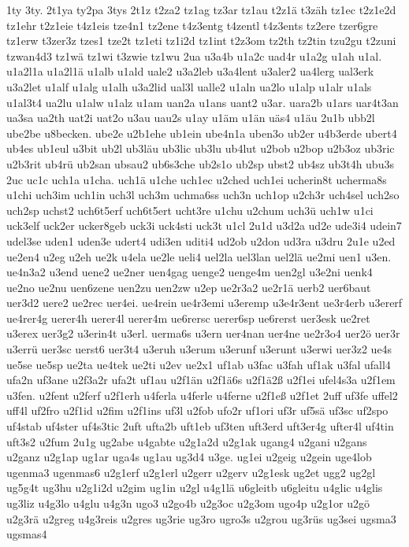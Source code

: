 {1ty
3ty.
2t1ya
ty2pa
3tys
2t1z
t2za2
tz1ag
tz3ar
tz1au
t2z1ä
t3zäh
tz1ec
t2z1e2d
tz1ehr
t2z1eie
t4z1eis
tze4n1
tz2ene
t4z3entg
t4zentl
t4z3ents
tz2ere
tzer6gre
tz1erw
t3zer3z
tzes1
tze2t
tz1eti
tz1i2d
tz1int
t2z3om
tz2th
tz2tin
tzu2gu
t2zuni
tzwan4d3
tz1wä
tz1wi
t3zwie
tz1wu
2ua
u3a4b
u1a2c
uad4r
u1a2g
u1ah
u1al.
u1a2l1a
u1a2l1ä
u1alb
u1ald
uale2
u3a2leb
u3a4lent
u3aler2
ua4lerg
ual3erk
u3a2let
u1alf
u1alg
u1alh
u3a2lid
ual3l
ualle2
u1aln
ua2lo
u1alp
u1alr
u1als
u1al3t4
ua2lu
u1alw
u1alz
u1am
uan2a
u1ans
uant2
u3ar.
uara2b
u1ars
uar4t3an
ua3sa
ua2th
uat2i
uat2o
u3au
uau2s
u1ay
u1äm
u1än
uäs4
u1äu
2u1b
ubb2l
ube2be
u8becken.
ube2e
u2b1ehe
ub1ein
ube4n1a
uben3o
ub2er
u4b3erde
ubert4
ub4es
ub1eul
u3bit
ub2l
ub3läu
ub3lic
ub3lu
ub4lut
u2bob
u2bop
u2b3oz
ub3ric
u2b3rit
ub4rü
ub2san
ubsau2
ub6s3che
ub2s1o
ub2sp
ubst2
ub4sz
ub3t4h
ubu3s
2uc
uc1c
uch1a
u1cha.
uch1ä
u1che
uch1ec
u2ched
uch1ei
ucherin8t
ucherma8s
u1chi
uch3im
uch1in
uch3l
uch3m
uchma6ss
uch3n
uch1op
u2ch3r
uch4sel
uch2so
uch2sp
uchst2
uch6t5erf
uch6t5ert
ucht3re
u1chu
u2chum
uch3ü
uch1w
u1ci
uck3elf
uck2er
ucker8geb
uck3i
uck4sti
uck3t
u1cl
2u1d
u3d2a
ud2e
ude3i4
udein7
udel3se
uden1
uden3e
udert4
udi3en
uditi4
ud2ob
u2don
ud3ra
u3dru
2u1e
u2ed
ue2en4
u2eg
u2eh
ue2k
u4ela
ue2le
ueli4
uel2la
uel3lan
uel2lä
ue2mi
uen1
u3en.
ue4n3a2
u3end
uene2
ue2ner
uen4gag
uenge2
uenge4m
uen2gl
u3e2ni
uenk4
ue2no
ue2nu
uen6zene
uen2zu
uen2zw
u2ep
ue2r3a2
ue2r1ä
uerb2
uer6baut
uer3d2
uere2
ue2rec
uer4ei.
ue4rein
ue4r3emi
u3eremp
u3e4r3ent
ue3r4erb
u3ererf
ue4rer4g
uerer4h
uerer4l
uerer4m
ue6rersc
uerer6sp
ue6rerst
uer3esk
ue2ret
u3erex
uer3g2
u3erin4t
u3erl.
uerma6s
u3ern
uer4nan
uer4ne
ue2r3o4
uer2ö
uer3r
u3errü
uer3sc
uerst6
uer3t4
u3eruh
u3erum
u3erunf
u3erunt
u3erwi
uer3z2
ue4s
ue5se
ue5sp
ue2ta
ue4tek
ue2ti
u2ev
ue2x1
uf1ab
u3fac
u3fah
uf1ak
u3fal
ufall4
ufa2n
uf3ane
u2f3a2r
ufa2t
uf1au
u2f1än
u2f1ä6s
u2f1ä2ß
u2f1ei
ufel4s3a
u2f1em
u3fen.
u2fent
u2ferf
u2f1erh
u4ferla
u4ferle
u4ferne
u2f1eß
u2f1et
2uff
uf3fe
uffel2
uff4l
uf2fro
u2f1id
u2fim
u2f1ins
uf3l
u2fob
ufo2r
uf1ori
uf3r
uf5sä
uf3sc
uf2spo
uf4stab
uf4ster
uf4s3tic
2uft
ufta2b
uft1eb
uf3ten
uft3erd
uft3er4g
ufter4l
uf4tin
uft3s2
u2fum
2u1g
ug2abe
u4gabte
u2g1a2d
u2g1ak
ugang4
u2gani
u2gans
u2ganz
u2g1ap
ug1ar
uga4s
ug1au
ug3d4
u3ge.
ug1ei
u2geig
u2gein
uge4lob
ugenma3
ugenmas6
u2g1erf
u2g1erl
u2gerr
u2gerv
u2g1esk
ug2et
ugg2
ug2gl
ug5g4t
ug3hu
u2g1i2d
u2gim
ug1in
u2gl
u4g1lä
u6gleitb
u6gleitu
u4glic
u4glis
ug3liz
u4g3lo
u4glu
u4g3n
ugo3
u2go4b
u2g3oc
u2g3om
ugo4p
u2g1or
u2gö
u2g3rä
u2greg
u4g3reis
u2gres
ug3rie
ug3ro
ugro3s
u2grou
ug3rüs
ug3sei
ugsma3
ugsmas4
}
